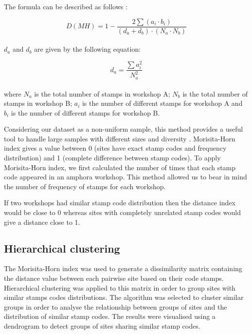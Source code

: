 \documentclass[review]{elsarticle}
\begin{document}
The formula can be described as follows \citep{magurran_measuring_2013}:

\begin{equation}
D(MH) = 1- \frac{2 \sum(a_{i} \cdot b_{i})}{(d_{a} + d_{b}) \cdot (N_{a} \cdot N_{b})}
\end{equation} \\

$d_{a}$ and $d_{b}$ are given by the following equation:

\begin{equation}
d_{a} = \frac{\sum a_{i}^{2}}{N_{a}^{2}} 
\end{equation} \\

where $N_{a}$ is the total number of stamps in workshop A; $N_{b}$ is the total number of stamps in workshop B; $a_{i}$ is the number of different stamps for workshop A and $b_{i}$ is the number of different stamps for workshop B.

Considering our dataset as a non-uniform sample, this method provides a useful tool to handle large samples with different sizes and diversity \citep{wolda_similarity_1981}. Morisita-Horn index gives a value between 0 (sites have exact stamp codes and frequency distribution) and 1 (complete difference between stamp codes). To apply Morisita-Horn index, we first calculated the number of times that each stamp code appeared in an amphora workshop. 
This method allowed us to bear in mind the number of frequency of stamps for each workshop. 

If two workshops had similar stamp code distribution then the distance index would be close to 0 whereas sites with completely unrelated stamp codes would give a distance close to 1.

\subsection{Hierarchical clustering}

The Morisita-Horn index was used to generate a dissimilarity matrix containing the distance value between each pairwise site based on their code stamps. Hierarchical clustering was applied to this matrix in order to group sites with similar stamps codes distributions. The algorithm was selected to cluster similar groups in order to analyse the relationship between groups of sites and the distribution of similar stamp codes. The results were visualised using a dendrogram to detect groups of sites sharing similar stamp codes.  
\end{document}
